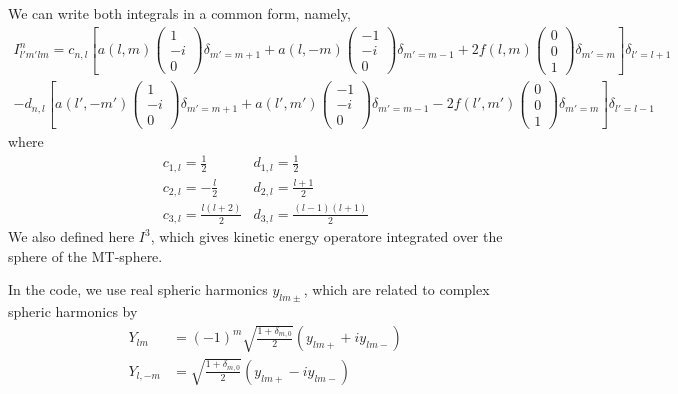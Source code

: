 \documentclass[aps,prb,floatfix,epsfig,singlecolumn,showpacs,preprintnumbers]{revtex4}
\begin{document}
We can write both integrals in a common form, namely,
\begin{eqnarray}
I^n_{l'm'lm}=c_{n,l}
\left[
a(l,m)
\left(
\begin{array}{c}
1\\
-i\\
0
\end{array}
\right)
\delta_{m'=m+1}
+a(l,-m)
\left(
\begin{array}{c}
-1\\
-i\\
0
\end{array}
\right)
\delta_{m'=m-1}
+2 f(l,m)
\left(
\begin{array}{c}
0\\
0\\
1
\end{array}
\right)
\delta_{m'=m}
\right]\delta_{l'=l+1}
\\
-d_{n,l}
\left[
a(l',-m')
\left(
\begin{array}{c}
1\\
-i\\
0
\end{array}
\right)
\delta_{m'=m+1}
+a(l',m')
\left(
\begin{array}{c}
-1\\
-i\\
0
\end{array}
\right)
\delta_{m'=m-1}
-2 f(l',m')
\left(
\begin{array}{c}
0\\
0\\
1
\end{array}
\right)
\delta_{m'=m}
\right]\delta_{l'=l-1}
\end{eqnarray}
where 
\begin{eqnarray}
& c_{1,l} = \frac{1}{2}      & d_{1,l}=\frac{1}{2}\\
& c_{2,l}=-\frac{l}{2}       & d_{2,l}=\frac{l+1}{2}\\
& c_{3,l}=\frac{l(l+2)}{2} & d_{3,l}=\frac{(l-1)(l+1)}{2}
\end{eqnarray}
We also defined here $I^3$, which gives kinetic energy operatore
integrated over the sphere of the MT-sphere.

In the code, we use real spheric harmonics $y_{lm\pm}$, which are related
to complex spheric harmonics by
\begin{eqnarray}
&Y_{lm}&=(-1)^m \sqrt{\frac{1+\delta_{m,0}}{2}}(y_{lm+}+i y_{lm-})\\
&Y_{l,-m}&=\sqrt{\frac{1+\delta_{m,0}}{2}}(y_{lm+}-i y_{lm-})
\end{eqnarray}
\end{document}
